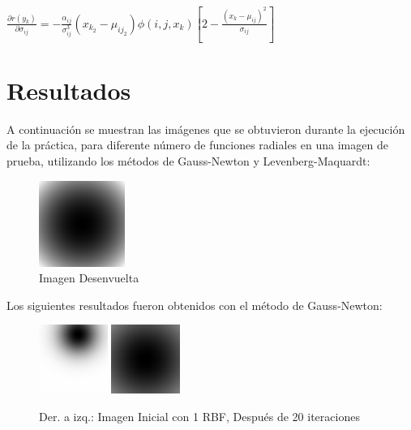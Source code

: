 \documentclass[10pt,journal,compsoc]{styles/IEEEtran}
\begin{document}
$\frac{\partial r(y_k)}{\partial \sigma_{ij}}=-\frac{\alpha_{ij}}{\sigma_{ij}^3}(x_{k_2}-\mu_{ij_2})\phi(i,j,x_k)[2-\frac{(x_k-\mu_{ij})^2}{\sigma_{ij}}]$\\

\section{Resultados}

A continuación se muestran las imágenes que se obtuvieron durante la ejecución de la práctica, para diferente n\'umero de funciones radiales en una imagen de prueba, utilizando los métodos de Gauss-Newton y Levenberg-Maquardt:\\


\begin{figure}[H]
\centering
\includegraphics[width=0.25\textwidth]{phase.png}
\caption{Imagen Desenvuelta}
\end{figure}

Los siguientes resultados fueron obtenidos con el método de Gauss-Newton:\\

\begin{figure}[H]
	\centering
	\includegraphics[width=0.20\textwidth]{GN1_0.png}
	\includegraphics[width=0.20\textwidth]{GN1_20.png}
	\caption{Der. a izq.: Imagen Inicial con 1 RBF, Después de 20 iteraciones}
\end{figure}
\end{document}
